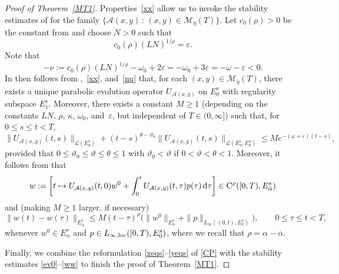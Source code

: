 \documentclass[reqno,11pt]{amsart}
\numberwithin{equation}{section}
\newcommand{\ve}{\varepsilon}
\newcommand{\rd}{\mathrm{d}}
\theoremstyle{remark}
\begin{document}
\begin{proof}[Proof of Theorem~\ref{MT1}]
Properties~\eqref{xx} allow us to invoke the stability estimates of \cite[Section~II.5]{LQPP} for the family
$\{\mathcal{A}(x,y)\,:\, (x,y)\in \mathcal{M}_\eta(T)\}$.
Let $c_0(\rho)>0$ be the constant from \cite[II.Theorem~5.1.1]{LQPP} and choose $N>0$ such that 
\begin{equation}\label{defN}
c_0(\rho)(LN)^{1/\rho}= \ve.
\end{equation} 
Note that  
\begin{equation}\label{nu}
-\nu:= c_0(\rho)(LN)^{1/\rho}-\omega_0+2\ve= -\omega_0+3\ve=-\omega-\ve <0.
\end{equation}
In  then follows from \cite[II.Theorem~5.1.1, II.Lemma~5.1.3]{LQPP},~\eqref{xx}, and~\eqref{nu} that, for each $(x,y)\in \mathcal{M}_\eta(T)$, there exists a unique parabolic evolution operator $U_{\mathcal{A}(x,y)}$ on $E_0^s$ with regularity subspace $E_1^s$. Moreover, there exists a constant $M\ge 1$ (depending on the constants $LN$, $\rho$, $\kappa$, $\omega_0$, and~$\ve$, but independent of $T\in(0,\infty]$) such that, 
for $ 0\le s\le t< T$,
\begin{equation}\label{ev0} 
\|U_{\mathcal{A}(x,y)}(t,s)\|_{\mathcal{L}(E_\theta^s)}+ (t-s)^{\theta-\vartheta_0}\|U_{\mathcal{A}(x,y)}(t,s)\|_{\mathcal{L}(E_\vartheta^s,E_\theta^s)}  \leq  Me^{-(\omega+\ve) (t-s)},
\end{equation}
provided that $0\le \vartheta_0\le \vartheta\le  \theta\le 1$ with $\vartheta_0<\vartheta$ if $0<\vartheta<  \theta< 1$. Moreover, it follows from
\cite[II.Theorem~5.3.1]{LQPP}  that
$$
w:=\left[t\mapsto U_{\mathcal{A}(x,y)}(t,0)w^0+\int_0^t U_{\mathcal{A}(x,y)}(t,\tau) p(\tau)\, \rd\tau\right]\in {\rm C}^{\rho}( [0,T),E_{\bar\alpha}^s)
$$
and (making $M\ge 1$ larger, if necessary)%
\begin{equation}\label{ww}
\|w(t)-w(\tau)\|_{E_{\bar\alpha}^s} \le M(t-\tau)^{\rho}\big(\|w^0\|_{E_{\alpha}^s}+\|p\|_{L_\infty((0,t),E_0^s)}\big), \qquad 0\le \tau\le  t< T,
\end{equation}
whenever $w^0\in E_{\alpha}^s$ and $p\in L_{\infty,{\rm loc}}([0,T),E_0^s)$, where we recall that $\rho=\alpha-\bar\alpha$.
\medskip

  Finally, we combine the reformulation \eqref{xeqs}–\eqref{yeqs} of \eqref{CP} with the stability estimates \eqref{ev0}–\eqref{ww} to finish the proof of Theorem~\ref{MT1}.


\end{proof}
\end{document}
